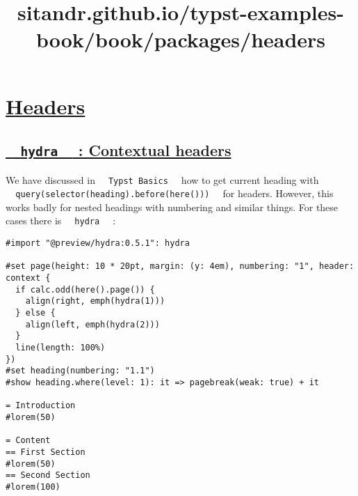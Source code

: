 \title{sitandr.github.io/typst-examples-book/book/packages/headers}

\section{\texorpdfstring{\hyperref[headers]{Headers}}{Headers}}\label{headers}

\subsection{\texorpdfstring{\hyperref[hydra-contextual-headers]{\texttt{\ }{\texttt{\ hydra\ }}\texttt{\ }
: Contextual
headers}}{  hydra   : Contextual headers}}\label{hydra-contextual-headers}

We have discussed in \texttt{\ }{\texttt{\ Typst\ Basics\ }}\texttt{\ }
how to get current heading with
\texttt{\ }{\texttt{\ query(selector(heading).before(here()))\ }}\texttt{\ }
for headers. However, this works badly for nested headings with
numbering and similar things. For these cases there is
\texttt{\ }{\texttt{\ hydra\ }}\texttt{\ } :

\begin{verbatim}
#import "@preview/hydra:0.5.1": hydra

#set page(height: 10 * 20pt, margin: (y: 4em), numbering: "1", header: context {
  if calc.odd(here().page()) {
    align(right, emph(hydra(1)))
  } else {
    align(left, emph(hydra(2)))
  }
  line(length: 100%)
})
#set heading(numbering: "1.1")
#show heading.where(level: 1): it => pagebreak(weak: true) + it

= Introduction
#lorem(50)

= Content
== First Section
#lorem(50)
== Second Section
#lorem(100)
\end{verbatim}

\pandocbounded{}

\pandocbounded{}

\pandocbounded{}

\pandocbounded{}
